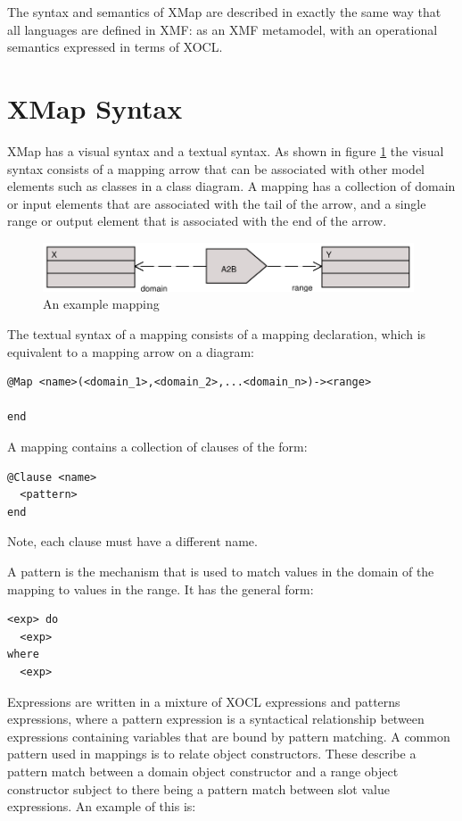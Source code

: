 The syntax and semantics of XMap are described in exactly the same
way that all languages are defined in XMF: as an XMF metamodel,
with an operational semantics expressed in terms of XOCL.

\section{XMap Syntax}

XMap has a visual syntax and a textual syntax. As shown in figure
\ref{examplemapping} the visual syntax consists of a mapping arrow
that can be associated with other model elements such as classes
in a class diagram. A mapping has a collection of domain or input
elements that are associated with the tail of the arrow, and a
single range or output element that is associated with the end of
the arrow.

\begin{figure}[htb]
\begin{center}
\includegraphics[width=11cm]{Mappings/figures/mapping.pdf}
\caption{An example mapping} \label{examplemapping}
\end{center}
\end{figure}


The textual syntax of a mapping consists of a mapping declaration,
which is equivalent to a mapping arrow on a diagram:

\begin{lstlisting}
@Map <name>(<domain_1>,<domain_2>,...<domain_n>)-><range>

end
\end{lstlisting}\noindent A mapping contains a collection of clauses of the form:

\begin{lstlisting}
@Clause <name>
  <pattern>
end
\end{lstlisting}\noindent Note, each clause must have a different name.

A pattern is the mechanism that is used to match values in the
domain of the mapping to values in the range. It has the general
form:

\begin{lstlisting}
<exp> do
  <exp>
where
  <exp>
\end{lstlisting}Expressions are written in a mixture of XOCL expressions and
patterns expressions, where a pattern expression is a syntactical
relationship between expressions containing variables that are
bound by pattern matching. A common pattern used in mappings is to
relate object constructors. These describe a pattern match between
a domain object constructor and a range object constructor subject
to there being a pattern match between slot value expressions. An
example of this is:

